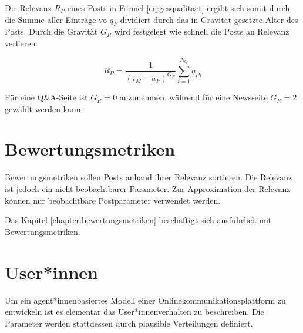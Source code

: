 Die Relevanz $R_P$ eines Posts in Formel \ref{eq:gesqualitaet} ergibt sich somit durch die Summe aller Einträge vo $q_P$ dividiert durch das in Gravität gesetzte Alter des Posts. Durch die Gravität $G_R$ wird festgelegt wie schnell die Posts an Relevanz verlieren:

\begin{equation}
\label{eq:gesqualitaet}
{R_P} = \frac{1}{(i_M - a_P)^{G_R}}\sum_{i=1}^{N_Q} {q_P}_i
\end{equation}

Für eine Q\&A-Seite ist $G_R = 0$ anzunehmen, während für eine Newsseite $G_R = 2$ gewählt werden kann.

\section{Bewertungsmetriken}
\label{sec:bewertungsmetrik}

Bewertungsmetriken sollen Posts anhand ihrer Relevanz sortieren. Die Relevanz ist jedoch ein nicht beobachtbarer Parameter. Zur Approximation der Relevanz können nur beobachtbare Postparameter verwendet werden.

Das Kapitel \ref{chapter:bewertungsmetriken} beschäftigt sich ausführlich mit Bewertungsmetriken.





\section{User*innen}


Um ein agent*innenbasiertes Modell einer Onlinekommunikationsplattform zu entwickeln ist es elementar das User*innenverhalten zu beschreiben. Die Parameter werden stattdessen durch plausible Verteilungen definiert.

